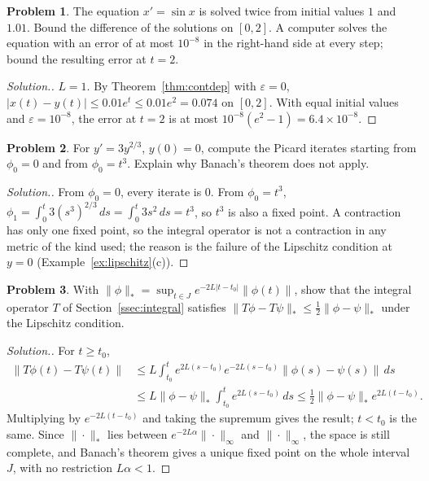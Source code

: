 \documentclass[11pt,a4paper]{article}
\numberwithin{equation}{section}
\theoremstyle{definition}
\newtheorem{problemx}{Problem}[subsection]
\newenvironment{problem}{\begin{problemx}}{\end{problemx}}
\newenvironment{solution}
  {\renewcommand{\qedsymbol}{}\begin{proof}[\textit{Solution}.]}
  {\end{proof}}
\begin{document}
\begin{problem}
The equation $x' = \sin x$ is solved twice from initial values $1$ and $1.01$. Bound the difference of the solutions on $[0, 2]$. A computer solves the equation with an error
of at most $10^{-8}$ in the right-hand side at every step; bound the resulting error at $t = 2$.
\end{problem}

\begin{solution}
$L = 1$. By Theorem~\ref{thm:contdep} with $\varepsilon = 0$, $|x(t) - y(t)| \leq 0.01e^t \leq 0.01e^2 = 0.074$ on $[0, 2]$. With equal initial values and $\varepsilon = 10^{-8}$, the error at $t = 2$ is at most
$10^{-8}(e^2 - 1) = 6.4 \times 10^{-8}$.
\end{solution}

\begin{problem}
For $y' = 3y^{2/3}$, $y(0) = 0$, compute the Picard iterates starting from $\phi_0 = 0$ and from $\phi_0 = t^3$. Explain why Banach's theorem does not apply.
\end{problem}

\begin{solution}
From $\phi_0 = 0$, every iterate is $0$. From $\phi_0 = t^3$, $\phi_1 = \int_0^t3(s^3)^{2/3}\,ds = \int_0^t3s^2\,ds = t^3$, so $t^3$ is also a fixed point. A contraction has only one fixed point, so the integral
operator is not a contraction in any metric of the kind used; the reason is the failure of the Lipschitz condition at $y = 0$ (Example~\ref{ex:lipschitz}(c)).
\end{solution}

\begin{problem}
\label{prob:bielecki}
With $\|\phi\|_\ast = \sup_{t \in J}e^{-2L|t - t_0|}\|\phi(t)\|$, show that the integral operator $T$ of Section~\ref{ssec:integral} satisfies $\|T\phi - T\psi\|_\ast \leq \frac12\|\phi - \psi\|_\ast$ under the Lipschitz condition.
\end{problem}

\begin{solution}
For $t \geq t_0$,
\begin{align*}
\|T\phi(t) - T\psi(t)\| &\leq L\int_{t_0}^te^{2L(s - t_0)}e^{-2L(s - t_0)}\|\phi(s) - \psi(s)\|\,ds\\
&\leq L\|\phi - \psi\|_\ast\int_{t_0}^te^{2L(s - t_0)}\,ds \leq \frac12\|\phi - \psi\|_\ast e^{2L(t - t_0)} .
\end{align*}
Multiplying by $e^{-2L(t - t_0)}$ and taking the supremum gives the result; $t < t_0$ is the same. Since $\|\cdot\|_\ast$ lies between $e^{-2L\alpha}\|\cdot\|_\infty$ and $\|\cdot\|_\infty$, the space is still complete, and
Banach's theorem gives a unique fixed point on the whole interval $J$, with no restriction $L\alpha < 1$.
\end{solution}
\end{document}

